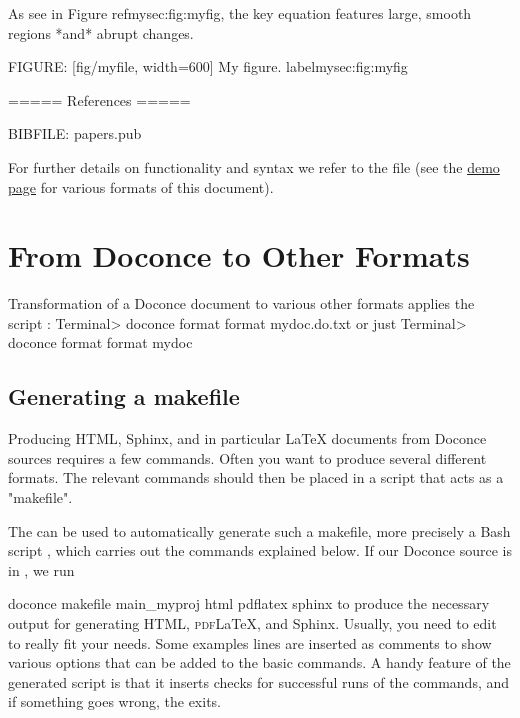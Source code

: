 \documentclass[%
oneside,                 %
final,                   %
10pt]{article}
\begin{document}
As see in Figure ref{mysec:fig:myfig}, the key equation
features large, smooth regions *and* abrupt changes.

FIGURE: [fig/myfile, width=600] My figure. label{mysec:fig:myfig}

===== References =====

BIBFILE: papers.pub
\eccq

For further details on functionality and
syntax we refer to the  file (see the
\href{{https://doconce.googlecode.com/hg/doc/demos/manual/index.html}}{demo page}
for various formats of this document).




\section{From Doconce to Other Formats}
\label{doconce2formats}

Transformation of a Doconce document  to various other
formats applies the script :
\bsys
Terminal> doconce format format mydoc.do.txt
\esys
or just
\bsys
Terminal> doconce format format mydoc
\esys

\subsection{Generating a makefile}

Producing HTML, Sphinx, and in particular {\LaTeX} documents from
Doconce sources requires a few commands. Often you want to
produce several different formats. The relevant commands should
then be placed in a script that acts as a "makefile".

The  can be used to automatically generate
such a makefile, more precisely a Bash script , which
carries out the commands explained below. If our Doconce source
is in , we run

\bsys
doconce makefile main_myproj html pdflatex sphinx
\esys
to produce the necessary output for generating HTML, \textsc{pdf}{\LaTeX}, and
Sphinx. Usually, you need to edit  to really fit your
needs. Some examples lines are inserted as comments to show
various options that can be added to the basic commands.
A handy feature of the generated  script is that it
inserts checks for successful runs of the  commands,
and if something goes wrong, the  exits.
\end{document}
